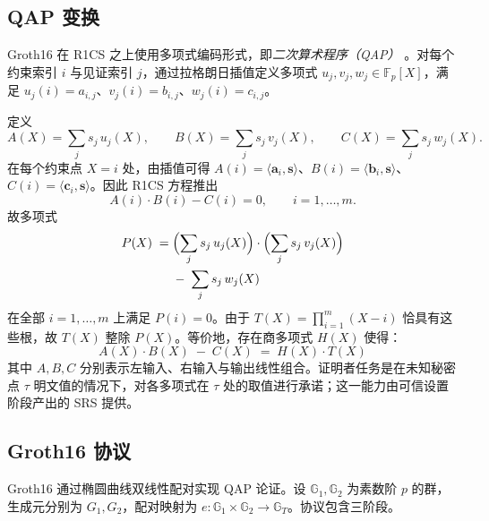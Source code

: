 \subsection{QAP 变换}

Groth16 在 R1CS 之上使用多项式编码形式，即\emph{二次算术程序（QAP）} \cite{gennaro2013}。对每个约束索引 $i$ 与见证索引 $j$，通过拉格朗日插值定义多项式 $u_j, v_j, w_j \in \mathbb{F}_p[X]$，满足 $u_j(i) = a_{i,j}$、$v_j(i) = b_{i,j}$、$w_j(i) = c_{i,j}$。

定义
\begin{equation*}
A(X)=\sum_j s_j\,u_j(X), \qquad B(X)=\sum_j s_j\,v_j(X), \qquad C(X)=\sum_j s_j\,w_j(X).
\end{equation*}
在每个约束点 $X=i$ 处，由插值可得 $A(i)=\langle \mathbf{a}_i,\mathbf{s}\rangle$、$B(i)=\langle \mathbf{b}_i,\mathbf{s}\rangle$、$C(i)=\langle \mathbf{c}_i,\mathbf{s}\rangle$。因此 R1CS 方程推出
\begin{equation*}
A(i)\cdot B(i)-C(i)=0, \qquad i=1,\dots,m.
\end{equation*}
故多项式
\begin{equation}
\begin{split}
    P(X) \;=\; &\Bigl(\sum_j s_j\, u_j(X)\Bigr) \cdot \Bigl(\sum_j s_j\, v_j(X)\Bigr) \\
               &-\; \sum_j s_j\, w_j(X)
\end{split}
\end{equation}
在全部 $i=1,\dots,m$ 上满足 $P(i)=0$。由于 $T(X)=\prod_{i=1}^{m}(X-i)$ 恰具有这些根，故 $T(X)$ 整除 $P(X)$。等价地，存在商多项式 $H(X)$ 使得：
\begin{equation}
    A(X) \cdot B(X) \;-\; C(X) \;=\; H(X) \cdot T(X)
\end{equation}
其中 $A,B,C$ 分别表示左输入、右输入与输出线性组合。证明者任务是在未知秘密点 $\tau$ 明文值的情况下，对各多项式在 $\tau$ 处的取值进行承诺；这一能力由可信设置阶段产出的 SRS 提供。

\subsection{Groth16 协议}

Groth16 通过椭圆曲线双线性配对实现 QAP 论证。设 $\mathbb{G}_1, \mathbb{G}_2$ 为素数阶 $p$ 的群，生成元分别为 $G_1, G_2$，配对映射为 $e: \mathbb{G}_1 \times \mathbb{G}_2 \rightarrow \mathbb{G}_T$。协议包含三阶段。

